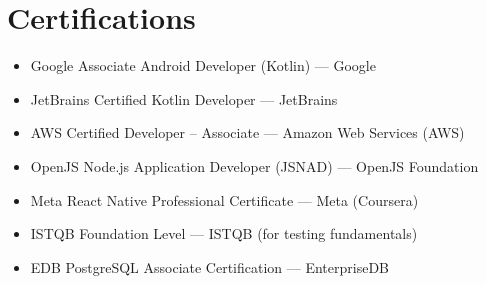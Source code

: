 \documentclass[10pt, letterpaper]{article}
\newenvironment{highlights}{
    \begin{itemize}[
        topsep=0.10 cm,
        parsep=0.10 cm,
        partopsep=0pt,
        itemsep=0.05cm, %
        leftmargin=10pt, %
        labelwidth=!, %
        labelsep=5pt %
    ]\justifying %
}{
    \end{itemize}
}
\newenvironment{onecolentry}{
    \begin{adjustwidth}{0cm}{0cm} %
    \RaggedRight %
}{
    \end{adjustwidth}
}
\begin{document}
        \section{Certifications}
        \begin{onecolentry}
            \begin{highlights}
                \item Google Associate Android Developer (Kotlin) — Google
                \item JetBrains Certified Kotlin Developer — JetBrains
                \item AWS Certified Developer – Associate — Amazon Web Services (AWS)
                \item OpenJS Node.js Application Developer (JSNAD) — OpenJS Foundation
                \item Meta React Native Professional Certificate — Meta (Coursera)
                \item ISTQB Foundation Level — ISTQB (for testing fundamentals)
                \item EDB PostgreSQL Associate Certification — EnterpriseDB
            \end{highlights}
        \end{onecolentry}

\end{document}
